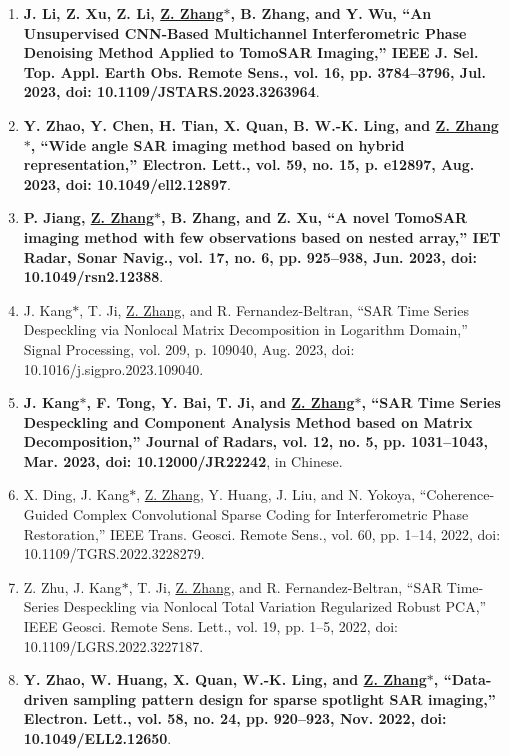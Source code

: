 \documentclass[paper=a4,fontsize=11pt]{scrartcl}
\begin{document}
\begin{enumerate}
\item \textbf{J. Li, Z. Xu, Z. Li, \underline{Z. Zhang$\ast$}, B. Zhang, and Y. Wu, ``An Unsupervised CNN-Based Multichannel Interferometric Phase Denoising Method Applied to TomoSAR Imaging,'' IEEE J. Sel. Top. Appl. Earth Obs. Remote Sens., vol. 16, pp. 3784–3796, Jul. 2023, doi: 10.1109/JSTARS.2023.3263964}.

\item \textbf{Y. Zhao, Y. Chen, H. Tian, X. Quan, B. W.-K. Ling, and \underline{Z. Zhang$\ast$}, ``Wide angle SAR imaging method based on hybrid representation,'' Electron. Lett., vol. 59, no. 15, p. e12897, Aug. 2023, doi: 10.1049/ell2.12897}.

\item \textbf{P. Jiang, \underline{Z. Zhang$\ast$}, B. Zhang, and Z. Xu, ``A novel TomoSAR imaging method with few observations based on nested array,'' IET Radar, Sonar Navig., vol. 17, no. 6, pp. 925–938, Jun. 2023, doi: 10.1049/rsn2.12388}.

\item J. Kang$\ast$, T. Ji, \underline{Z. Zhang}, and R. Fernandez-Beltran, ``SAR Time Series Despeckling via Nonlocal Matrix Decomposition in Logarithm Domain,'' Signal Processing, vol. 209, p. 109040, Aug. 2023, doi: 10.1016/j.sigpro.2023.109040.

\item \textbf{J. Kang$\ast$, F. Tong, Y. Bai, T. Ji, and \underline{Z. Zhang$\ast$}, ``SAR Time Series Despeckling and Component Analysis Method based on Matrix Decomposition,'' Journal of Radars, vol. 12, no. 5, pp. 1031–1043, Mar. 2023, doi: 10.12000/JR22242}, in Chinese.

\item X. Ding, J. Kang$\ast$, \underline{Z. Zhang}, Y. Huang, J. Liu, and N. Yokoya, ``Coherence-Guided Complex Convolutional Sparse Coding for Interferometric Phase Restoration,'' IEEE Trans. Geosci. Remote Sens., vol. 60, pp. 1–14, 2022, doi: 10.1109/TGRS.2022.3228279.

\item Z. Zhu, J. Kang$\ast$, T. Ji, \underline{Z. Zhang}, and R. Fernandez-Beltran, ``SAR Time-Series Despeckling via Nonlocal Total Variation Regularized Robust PCA,'' IEEE Geosci. Remote Sens. Lett., vol. 19, pp. 1–5, 2022, doi: 10.1109/LGRS.2022.3227187.​

\item \textbf{Y. Zhao, W. Huang, X. Quan, W.-K. Ling, and \underline{Z. Zhang$\ast$}, ``Data-driven sampling pattern design for sparse spotlight SAR imaging,'' Electron. Lett., vol. 58, no. 24, pp. 920–923, Nov. 2022, doi: 10.1049/ELL2.12650}.


\end{enumerate}
\end{document}
